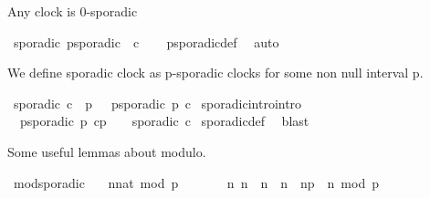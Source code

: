 \begin{isabellebody}
\begin{isamarkuptext}%
Any clock is 0-sporadic%
\end{isamarkuptext}\isamarkuptrue%
\isamarkupfalse%
\ sporadic{\isacharunderscore}{}{\isacharcolon}\ {\isacartoucheopen}p{\isacharunderscore}sporadic\ {}\ c{\isacartoucheclose}\isanewline
%
\isadelimproof
\ \ %
\endisadelimproof
%
\isatagproof
{}\isamarkupfalse%
\ p{\isacharunderscore}sporadic{\isacharunderscore}def\ \isamarkupfalse%
\ auto%
\endisatagproof
{\isafoldproof}%
%
\isadelimproof
%
\endisadelimproof
%
\begin{isamarkuptext}%
We define sporadic clock as p-sporadic clocks for some non null interval p.%
\end{isamarkuptext}\isamarkuptrue%
\isamarkupfalse%
\ {\isacartoucheopen}sporadic\ c\ {\isasymequiv}\ {\isacharparenleft}{\isasymexists}p\ {\isachargreater}\ {}{\isachardot}\ p{\isacharunderscore}sporadic\ p\ c{\isacharparenright}{\isacartoucheclose}\isanewline
\isanewline
{}\isamarkupfalse%
\ sporadic{\isacharunderscore}intro{\isacharbrackleft}intro{\isacharbrackright}\isanewline
\ \ {\isacharcolon}{\isacartoucheopen}{\isasymlbrakk}p{\isacharunderscore}sporadic\ p\ c{\isacharsemicolon}p\ {\isachargreater}\ {}{\isasymrbrakk}\ {\isasymLongrightarrow}\ sporadic\ c{\isacartoucheclose}\isanewline
%
\isadelimproof
%
\endisadelimproof
%
\isatagproof
{}\isamarkupfalse%
\ sporadic{\isacharunderscore}def\ \isamarkupfalse%
\ blast%
\endisatagproof
{\isafoldproof}%
%
\isadelimproof
%
\endisadelimproof
%
\isadelimdocument
%
\endisadelimdocument
%
\isatagdocument
%
\isamarkuptrue%
%
\endisatagdocument
{\isafolddocument}%
%
\isadelimdocument
%
\endisadelimdocument
%
\begin{isamarkuptext}%
Some useful lemmas about modulo.%
\end{isamarkuptext}\isamarkuptrue%
\isamarkupfalse%
\ mod{\isacharunderscore}sporadic{\isacharcolon}\isanewline
\ \ \ {\isacartoucheopen}{\isacharparenleft}{\isacharparenleft}n{\isacharcolon}{\isacharcolon}nat{\isacharparenright}\ mod\ p\ {\isacharequal}\ {}{\isacharparenright}{\isacartoucheclose}\isanewline
\ \ \ \ \ {\isacartoucheopen}{\isasymforall}n{\isacharprime}{\isachardot}\ {\isacharparenleft}n\ {\isacharless}\ n{\isacharprime}\ {\isasymand}\ n{\isacharprime}\ {\isacharless}\ n{\isacharplus}p{\isacharparenright}\ {\isasymlongrightarrow}\ {\isasymnot}{\isacharparenleft}n{\isacharprime}\ mod\ p\ {\isacharequal}\ {}{\isacharparenright}{\isacartoucheclose}\isanewline

\end{isabellebody}

